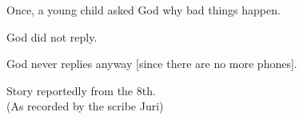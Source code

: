 Once, a young child asked God why bad things happen.

God did not reply.

God never replies anyway [since there are no more phones].

\hfill
    \begin{minipage}{.79\textwidth}
      \noindent\emdashStart
      Story reportedly from the 8th. \\
      (As recorded by the scribe Juri)
    \end{minipage}
